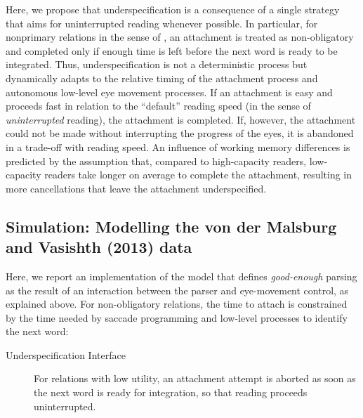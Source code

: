 \documentclass{cambridge7A}\usepackage[]{graphicx}\usepackage[]{color}
\begin{document}
Here, we propose that underspecification is a consequence of a single strategy that aims for  uninterrupted reading whenever possible.
In particular, for nonprimary relations in the sense of \cite{FrazierClifton1997}, an attachment is treated as non-obligatory and completed only if enough time is left before the next word is ready to be integrated.
Thus, underspecification is not a deterministic process but dynamically adapts to the relative timing of the attachment process and autonomous low-level eye movement processes. If an attachment is easy and proceeds fast in relation to the ``default'' reading speed (in the sense of \emph{uninterrupted} reading), the attachment is completed. If, however, the attachment could not be made without interrupting the progress of the eyes, it is abandoned in a trade-off with reading speed. 
An influence of working memory differences is predicted by the assumption that, compared to high-capacity readers, low-capacity readers take longer on average to complete the attachment, resulting in more cancellations that leave the attachment underspecified.



\subsection{Simulation: Modelling the von der Malsburg and Vasishth (2013) data}
Here, we report an implementation of the model that defines \emph{good-enough} parsing as the result of an interaction between the parser and eye-movement control, as explained above. For non-obligatory relations, the time to attach is constrained by the time needed by saccade programming and low-level processes to identify the next word:

\begin{description}
  \item[Underspecification Interface]  For relations with low utility, an attachment attempt is aborted as soon as the next word is ready for integration, so that reading proceeds uninterrupted.
\end{description}
\end{document}
